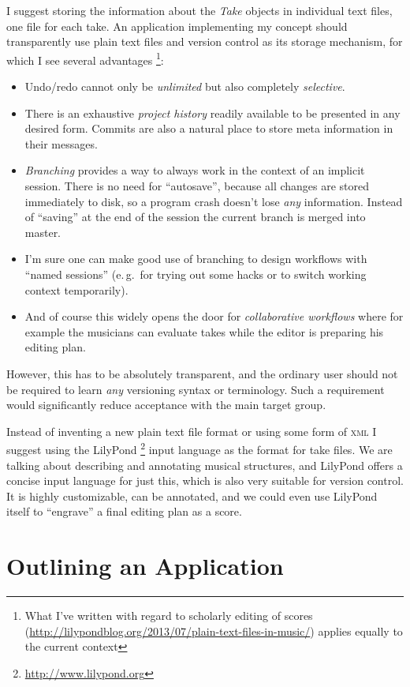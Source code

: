 \documentclass[11pt,a4paper]{article}
\begin{document}
I suggest storing the information about the \emph{Take} objects in individual text files, one file for each take.
An application implementing my concept should transparently use plain text files and version control as its storage mechanism, for which I see several advantages%
\footnote{What I've written with regard to scholarly editing of scores (\url{http://lilypondblog.org/2013/07/plain-text-files-in-music/}) applies equally to the current context}:
\begin{itemize}
\item Undo/redo cannot only be \emph{unlimited} but also completely \emph{selective}.
\item There is an exhaustive \emph{project history} readily available to be presented in any desired form.
Commits are also a natural place to store meta information in their messages.
\item \emph{Branching} provides a way to always work in the context of an implicit session.
There is no need for “autosave”, because all changes are stored immediately to disk, so a program crash doesn't lose \emph{any} information.
Instead of “saving” at the end of the session the current branch is merged into master.
\item I'm sure one can make good use of branching to design workflows with “named sessions” (e.\,g.\ for trying out some hacks or to switch working context temporarily).
\item And of course this widely opens the door for \emph{collaborative workflows} where for example the musicians can evaluate takes while the editor is preparing his editing plan.
\end{itemize}

However, this has to be absolutely transparent, and the ordinary user should not be required to learn \emph{any} versioning syntax or terminology.
Such a requirement would significantly reduce acceptance with the main target group.

\medskip
Instead of inventing a new plain text file format or using some form of \textsc{xml} I suggest using the LilyPond%
\footnote{\url{http://www.lilypond.org}}
input language as the format for take files.
We are talking about describing and annotating musical structures, and LilyPond offers a concise input language for just this, which is also very suitable for version control.
It is highly customizable, can be annotated, and we could even use LilyPond itself to “engrave” a final editing plan as a score.

\section{Outlining an Application}
\end{document}
